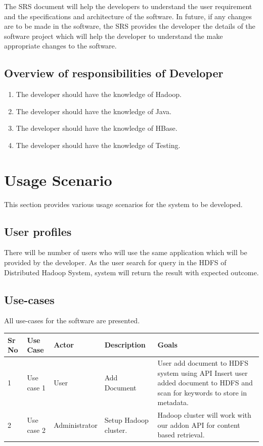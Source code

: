 \documentclass[oneside,a4paper,12pt]{report}
\begin{document}
The SRS document will help the developers to understand the user requirement and the specifications and architecture of the software. In future, if any changes are to be made in the software, the SRS provides the developer the details of the software project which will help the developer to understand the make appropriate changes to the software. 


\subsection{Overview of responsibilities of Developer}
\begin{enumerate}
\item The developer should have the knowledge of Hadoop.
\item The developer should have the knowledge of Java.
\item The developer should have the knowledge of HBase.
\item The developer should have the knowledge of Testing.
\end{enumerate}


\section{Usage Scenario}
This section provides various usage scenarios for the system to be developed.
 
 \subsection{User profiles}  
There will be number of users who will use the same application which will be provided by the developer. As the user search for query in the HDFS of Distributed Hadoop System, system will return the result with expected outcome. 

\subsection{Use-cases}
All use-cases for the software are presented.

{\tabulinesep=2mm
   \begin{longtabu} { |p{2.5cm} | p{2.5cm} | p{2.5cm }| p{2.5cm }| p{2.5cm }|}
       \hline

\textbf{Sr No} & \textbf{Use Case } & \textbf{Actor} & \textbf{Description} & \textbf{Goals} \\ \hline

1 & Use case 1 & User & Add Document & User add document to HDFS system using API  Insert user added document to HDFS and scan for keywords to store in metadata.
\\  & Use case 2 & Administrator & Setup Hadoop cluster. & Hadoop cluster will work with our addon API for content based retrieval. \\ \hline

   \end{longtabu}
}
\end{document}
